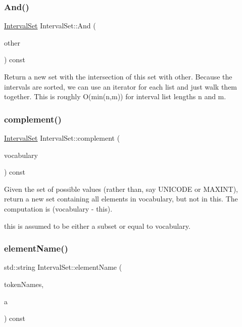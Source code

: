 \subsubsection{\texorpdfstring{And()}{And()}}
{\footnotesize\ttfamily \hyperlink{classantlr4_1_1misc_1_1IntervalSet}{Interval\+Set} Interval\+Set\+::\+And (\begin{DoxyParamCaption}\item[{const \hyperlink{classantlr4_1_1misc_1_1IntervalSet}{Interval\+Set} \&}]{other }\end{DoxyParamCaption}) const}

Return a new set with the intersection of this set with other. Because the intervals are sorted, we can use an iterator for each list and just walk them together. This is roughly O(min(n,m)) for interval list lengths n and m. \mbox{\label{classantlr4_1_1misc_1_1IntervalSet_a8abb367611d1797657ae64247403f4e2}} 
\subsubsection{\texorpdfstring{complement()}{complement()}}
{\footnotesize\ttfamily \hyperlink{classantlr4_1_1misc_1_1IntervalSet}{Interval\+Set} Interval\+Set\+::complement (\begin{DoxyParamCaption}\item[{const \hyperlink{classantlr4_1_1misc_1_1IntervalSet}{Interval\+Set} \&}]{vocabulary }\end{DoxyParamCaption}) const}

Given the set of possible values (rather than, say U\+N\+I\+C\+O\+DE or M\+A\+X\+I\+NT), return a new set containing all elements in vocabulary, but not in this. The computation is (vocabulary -\/ this).

\textquotesingle{}this\textquotesingle{} is assumed to be either a subset or equal to vocabulary. \mbox{\label{classantlr4_1_1misc_1_1IntervalSet_a10334d09c666f59ced45f43b9cd2772a}} 
\subsubsection{\texorpdfstring{element\+Name()}{elementName()}}
{\footnotesize\ttfamily std\+::string Interval\+Set\+::element\+Name (\begin{DoxyParamCaption}\item[{const std\+::vector$<$ std\+::string $>$ \&}]{token\+Names,  }\item[{ssize\+\_\+t}]{a }\end{DoxyParamCaption}) const\hspace{0.3cm}{\ttfamily [protected]}}

